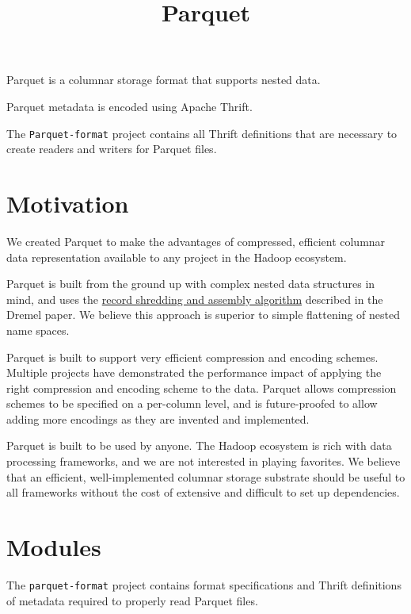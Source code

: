 \documentclass[a4paper,12pt,notitlepage,twoside,openright]{article}
\title{Parquet}
\begin{document}
\maketitle

Parquet is a columnar storage format that supports nested data.

Parquet metadata is encoded using Apache Thrift.

The \texttt{Parquet-format} project contains all Thrift definitions that
are necessary to create readers and writers for Parquet files.

\hypertarget{motivation}{%
\section{Motivation}\label{motivation}}

We created Parquet to make the advantages of compressed, efficient
columnar data representation available to any project in the Hadoop
ecosystem.

Parquet is built from the ground up with complex nested data structures
in mind, and uses the
\href{https://github.com/julienledem/redelm/wiki/The-striping-and-assembly-algorithms-from-the-Dremel-paper}{record
shredding and assembly algorithm} described in the Dremel paper. We
believe this approach is superior to simple flattening of nested name
spaces.

Parquet is built to support very efficient compression and encoding
schemes. Multiple projects have demonstrated the performance impact of
applying the right compression and encoding scheme to the data. Parquet
allows compression schemes to be specified on a per-column level, and is
future-proofed to allow adding more encodings as they are invented and
implemented.

Parquet is built to be used by anyone. The Hadoop ecosystem is rich with
data processing frameworks, and we are not interested in playing
favorites. We believe that an efficient, well-implemented columnar
storage substrate should be useful to all frameworks without the cost of
extensive and difficult to set up dependencies.

\hypertarget{modules}{%
\section{Modules}\label{modules}}

The \texttt{parquet-format} project contains format specifications and
Thrift definitions of metadata required to properly read Parquet files.
\end{document}
